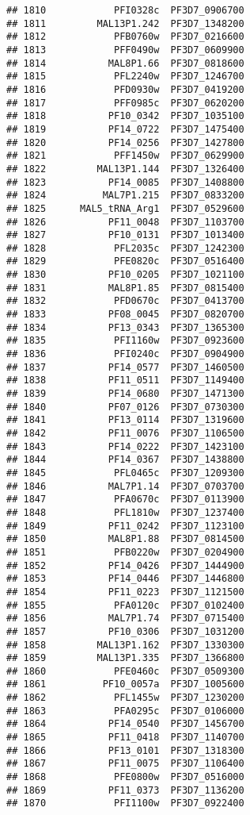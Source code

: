 \documentclass{article}\usepackage[]{graphicx}\usepackage[]{color}
\makeatletter
\newenvironment{kframe}{%
 \def\at@end@of@kframe{}%
 \ifinner\ifhmode%
  \def\at@end@of@kframe{\end{minipage}}%
  \begin{minipage}{\columnwidth}%
 \fi\fi%
 \def\FrameCommand##1{\hskip\@totalleftmargin \hskip-\fboxsep
 \colorbox{shadecolor}{##1}\hskip-\fboxsep
     \hskip-\linewidth \hskip-\@totalleftmargin \hskip\columnwidth}%
 \MakeFramed {\advance\hsize-\width
   \@totalleftmargin\z@ \linewidth\hsize
   \@setminipage}}%
 {\par\unskip\endMakeFramed%
 \at@end@of@kframe}
\newenvironment{knitrout}{}{} %
\makeatother
\begin{document}
\begin{knitrout}
\begin{kframe}
\begin{verbatim}
## 1810            PFI0328c  PF3D7_0906700
## 1811         MAL13P1.242  PF3D7_1348200
## 1812            PFB0760w  PF3D7_0216600
## 1813            PFF0490w  PF3D7_0609900
## 1814           MAL8P1.66  PF3D7_0818600
## 1815            PFL2240w  PF3D7_1246700
## 1816            PFD0930w  PF3D7_0419200
## 1817            PFF0985c  PF3D7_0620200
## 1818           PF10_0342  PF3D7_1035100
## 1819           PF14_0722  PF3D7_1475400
## 1820           PF14_0256  PF3D7_1427800
## 1821            PFF1450w  PF3D7_0629900
## 1822         MAL13P1.144  PF3D7_1326400
## 1823           PF14_0085  PF3D7_1408800
## 1824          MAL7P1.215  PF3D7_0833200
## 1825      MAL5_tRNA_Arg1  PF3D7_0529600
## 1826           PF11_0048  PF3D7_1103700
## 1827           PF10_0131  PF3D7_1013400
## 1828            PFL2035c  PF3D7_1242300
## 1829            PFE0820c  PF3D7_0516400
## 1830           PF10_0205  PF3D7_1021100
## 1831           MAL8P1.85  PF3D7_0815400
## 1832            PFD0670c  PF3D7_0413700
## 1833           PF08_0045  PF3D7_0820700
## 1834           PF13_0343  PF3D7_1365300
## 1835            PFI1160w  PF3D7_0923600
## 1836            PFI0240c  PF3D7_0904900
## 1837           PF14_0577  PF3D7_1460500
## 1838           PF11_0511  PF3D7_1149400
## 1839           PF14_0680  PF3D7_1471300
## 1840           PF07_0126  PF3D7_0730300
## 1841           PF13_0114  PF3D7_1319600
## 1842           PF11_0076  PF3D7_1106500
## 1843           PF14_0222  PF3D7_1423100
## 1844           PF14_0367  PF3D7_1438800
## 1845            PFL0465c  PF3D7_1209300
## 1846           MAL7P1.14  PF3D7_0703700
## 1847            PFA0670c  PF3D7_0113900
## 1848            PFL1810w  PF3D7_1237400
## 1849           PF11_0242  PF3D7_1123100
## 1850           MAL8P1.88  PF3D7_0814500
## 1851            PFB0220w  PF3D7_0204900
## 1852           PF14_0426  PF3D7_1444900
## 1853           PF14_0446  PF3D7_1446800
## 1854           PF11_0223  PF3D7_1121500
## 1855            PFA0120c  PF3D7_0102400
## 1856           MAL7P1.74  PF3D7_0715400
## 1857           PF10_0306  PF3D7_1031200
## 1858         MAL13P1.162  PF3D7_1330300
## 1859         MAL13P1.335  PF3D7_1366800
## 1860            PFE0460c  PF3D7_0509300
## 1861          PF10_0057a  PF3D7_1005600
## 1862            PFL1455w  PF3D7_1230200
## 1863            PFA0295c  PF3D7_0106000
## 1864           PF14_0540  PF3D7_1456700
## 1865           PF11_0418  PF3D7_1140700
## 1866           PF13_0101  PF3D7_1318300
## 1867           PF11_0075  PF3D7_1106400
## 1868            PFE0800w  PF3D7_0516000
## 1869           PF11_0373  PF3D7_1136200
## 1870            PFI1100w  PF3D7_0922400

\end{verbatim}
\end{kframe}
\end{knitrout}
\end{document}
